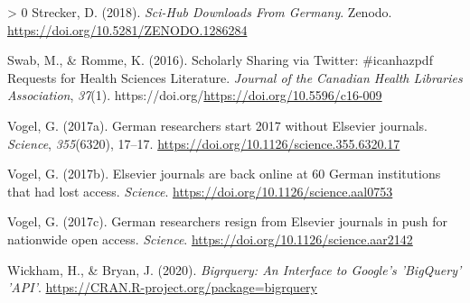 \documentclass[
]{article}
\newlength{\cslhangindent}
\newenvironment{CSLReferences}[3] %
 {%
  \setlength{\parindent}{0pt}
  \ifodd #1 \everypar{\setlength{\hangindent}{\cslhangindent}}\ignorespaces\fi
  \ifnum #2 > 0
  \setlength{\parskip}{#3\baselineskip}
  \fi
 }%
 {}
\begin{document}
\begin{CSLReferences}{1}{0}
\leavevmode\hypertarget{ref-strecker_sci-hub_2018}{}%
Strecker, D. (2018). \emph{Sci-{Hub} {Downloads} {From} {Germany}}. Zenodo. \url{https://doi.org/10.5281/ZENODO.1286284}

\leavevmode\hypertarget{ref-swab_scholarly_2016}{}%
Swab, M., \& Romme, K. (2016). Scholarly {Sharing} via {Twitter}: \#icanhazpdf {Requests} for {Health} {Sciences} {Literature}. \emph{Journal of the Canadian Health Libraries Association}, \emph{37}(1). https://doi.org/\url{https://doi.org/10.5596/c16-009}

\leavevmode\hypertarget{ref-vogel_german_2017}{}%
Vogel, G. (2017a). German researchers start 2017 without {Elsevier} journals. \emph{Science}, \emph{355}(6320), 17--17. \url{https://doi.org/10.1126/science.355.6320.17}

\leavevmode\hypertarget{ref-vogel_elsevier_2017}{}%
Vogel, G. (2017b). Elsevier journals are back online at 60 {German} institutions that had lost access. \emph{Science}. \url{https://doi.org/10.1126/science.aal0753}

\leavevmode\hypertarget{ref-vogel_german_2017-1}{}%
Vogel, G. (2017c). German researchers resign from {Elsevier} journals in push for nationwide open access. \emph{Science}. \url{https://doi.org/10.1126/science.aar2142}

\leavevmode\hypertarget{ref-wickham_bigrquery_2020}{}%
Wickham, H., \& Bryan, J. (2020). \emph{Bigrquery: {An} {Interface} to {Google}'s '{BigQuery}' '{API}'}. \url{https://CRAN.R-project.org/package=bigrquery}

\end{CSLReferences}
\end{document}
